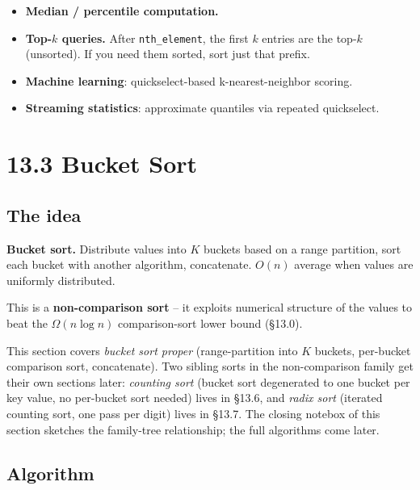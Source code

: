 \documentclass[11pt]{article}
\begin{document}
\begin{itemize}[leftmargin=*]
    \item \textbf{Median / percentile computation.}
    \item \textbf{Top-$k$ queries.} After \texttt{nth\_element}, the first $k$ entries are the top-$k$ (unsorted). If you need them sorted, sort just that prefix.
    \item \textbf{Machine learning}: quickselect-based k-nearest-neighbor scoring.
    \item \textbf{Streaming statistics}: approximate quantiles via repeated quickselect.
\end{itemize}

\section{13.3 Bucket Sort}

\subsection*{The idea}

\begin{defnbox}
\textbf{Bucket sort.} Distribute values into $K$ buckets based on a range partition, sort each bucket with another algorithm, concatenate. $O(n)$ average when values are uniformly distributed.
\end{defnbox}

This is a \textbf{non-comparison sort} -- it exploits numerical structure of the values to beat the $\Omega(n \log n)$ comparison-sort lower bound (\S13.0).

\begin{notebox}[Scope of \S13.3 vs.\ \S13.6 / \S13.7]
This section covers \emph{bucket sort proper} (range-partition into
$K$ buckets, per-bucket comparison sort, concatenate). Two
sibling sorts in the non-comparison family get their own sections
later: \emph{counting sort} (bucket sort degenerated to one bucket
per key value, no per-bucket sort needed) lives in \S13.6, and
\emph{radix sort} (iterated counting sort, one pass per digit)
lives in \S13.7. The closing notebox of this section sketches the
family-tree relationship; the full algorithms come later.
\end{notebox}

\subsection*{Algorithm}
\end{document}
